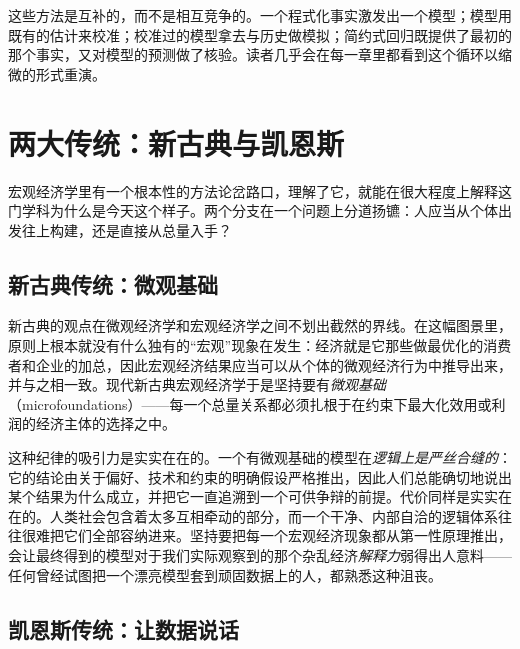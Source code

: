 这些方法是互补的，而不是相互竞争的。一个程式化事实激发出一个模型；模型用既有的估计来校准；校准过的模型拿去与历史做模拟；简约式回归既提供了最初的那个事实，又对模型的预测做了核验。读者几乎会在每一章里都看到这个循环以缩微的形式重演。


\section{两大传统：新古典与凯恩斯}

宏观经济学里有一个根本性的方法论岔路口，理解了它，就能在很大程度上解释这门学科为什么是今天这个样子。两个分支在一个问题上分道扬镳：人应当从个体出发往上构建，还是直接从总量入手？

\subsection{新古典传统：微观基础}

新古典的观点在微观经济学和宏观经济学之间不划出截然的界线。在这幅图景里，原则上根本就没有什么独有的``宏观''现象在发生：经济就是它那些做最优化的消费者和企业的加总，因此宏观经济结果应当可以从个体的微观经济行为中推导出来，并与之相一致。现代新古典宏观经济学于是坚持要有\emph{微观基础}（microfoundations）——每一个总量关系都必须扎根于在约束下最大化效用或利润的经济主体的选择之中。

这种纪律的吸引力是实实在在的。一个有微观基础的模型在\emph{逻辑上是严丝合缝的}：它的结论由关于偏好、技术和约束的明确假设严格推出，因此人们总能确切地说出某个结果为什么成立，并把它一直追溯到一个可供争辩的前提。代价同样是实实在在的。人类社会包含着太多互相牵动的部分，而一个干净、内部自洽的逻辑体系往往很难把它们全部容纳进来。坚持要把每一个宏观经济现象都从第一性原理推出，会让最终得到的模型对于我们实际观察到的那个杂乱经济\emph{解释力}弱得出人意料——任何曾经试图把一个漂亮模型套到顽固数据上的人，都熟悉这种沮丧。

\subsection{凯恩斯传统：让数据说话}

